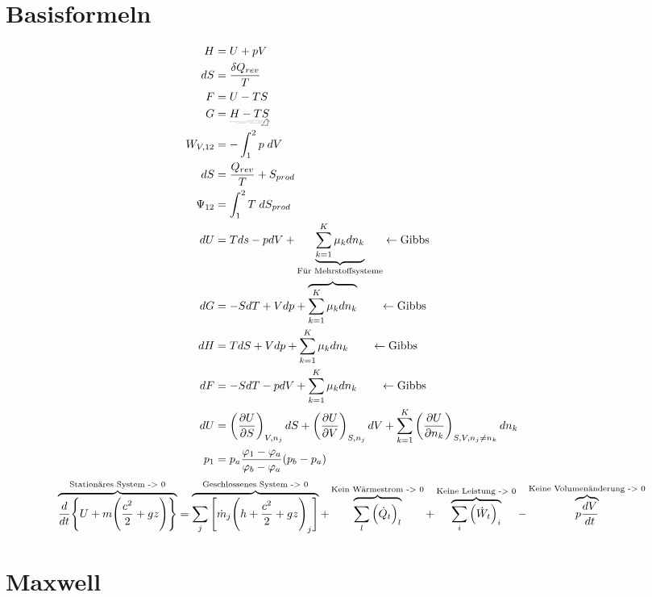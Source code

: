 \documentclass[twocolumn]{article}
\begin{document}
\section{Basisformeln}
\begin{align*}
	H &= U + pV  					\\
	dS&=\frac{\delta Q_{rev}}{T}			\\
	F &= U-TS					\\
	G &= \underrightswishingghost{H-TS}					\\
	W_{V,12} &= -\int_{1}^{2} p\; dV 		\\
	dS &= \frac{Q_{rev}}{T} + S_{prod}		\\
	\Psi_{12} &= \int_{1}^{2} T\; dS_{prod}		\\
	dU &= Tds -pdV + \underbrace{\sum_{k=1}^{K} \mu_k dn_k}_{\text{Für Mehrstoffsysteme}} \leftarrow \text{Gibbs} \\
	dG &= -SdT + Vdp +  \overbrace{\sum_{k=1}^{K} \mu_k dn_k} \qquad \leftarrow \text{Gibbs} \\
	dH &= TdS + Vdp + \sum_{k=1}^{K} \mu_k dn_k \qquad \leftarrow \text{Gibbs}\\
	dF &= -SdT -pdV + \sum_{k=1}^{K} \mu _k dn_k \qquad \leftarrow \text{Gibbs}\\
	dU &= \left(\frac{\partial U}{\partial S}\right)_{V,n_j} dS + \left(\frac{\partial U}{\partial V}\right)_{S,n_j} dV + \sum_{k=1}^{K} \left(\frac{\partial U}{\partial n_k}\right)_{S,V,n_j \neq n_k} dn_k  \\
	p_1 &= p_a  \frac{\varphi_1 - \varphi_a}{\varphi_b- \varphi_a}(p_b - p_a) \\
\end{align*}
\begin{equation*}
\overbrace{\frac{d}{dt}\Bigg{\{} U + m \Bigg{(}\frac{c^2}{2}+gz\Bigg{)}\Bigg{\}}}^{\text{Stationäres System -> 0}} = \overbrace{\sum_{j}{\Bigg{[}\dot{m}_j\Bigg{(}h+\frac{c^2}{2}+gz\Bigg{)}_j \Bigg{]}}}^{\text{Geschlossenes System -> 0}}  + \overbrace{\sum_{l}^{} \Big(\dot{Q}_t\Big)_l}^{\text{Kein Wärmestrom -> 0}} + \overbrace{\sum_{i}\Big(\dot{W}_t\Big)_i}^{\text{Keine Leistung -> 0}}- \overbrace{p\frac{dV}{dt}}^{\text{Keine Volumenänderung -> 0}}
\end{equation*}

\section{Maxwell}
\end{document}
